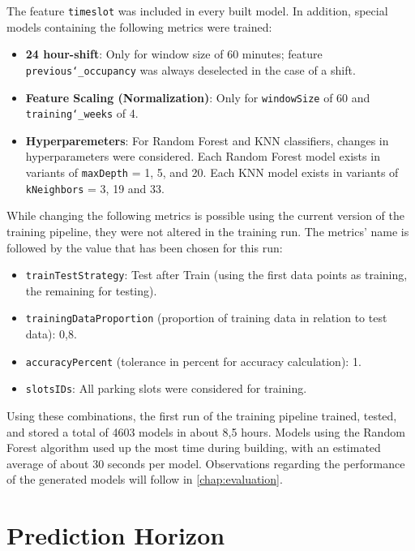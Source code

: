  The feature \texttt{timeslot} was included in every built model. In addition, special models containing the following metrics were trained:
 
 \begin{itemize}
 	\item \textbf{24 hour-shift}: Only for window size of 60 minutes; feature \texttt{previous\char`_occupancy} was always deselected in the case of a shift. 
\item \textbf{Feature Scaling (Normalization)}: Only for \texttt{windowSize} of 60 and \texttt{training\char`_weeks} of 4.
\item \textbf{Hyperparemeters}: For Random Forest and KNN classifiers, changes in hyperparameters were considered. Each Random Forest model exists in variants of \texttt{maxDepth} = 1, 5, and 20. Each KNN model exists in variants of \texttt{kNeighbors} = 3, 19 and 33.
 \end{itemize}
 
 While changing the following metrics is possible using the current version of the training pipeline, they were not altered in the training run. The metrics’ name is followed by the value that has been chosen for this run:
 
 \begin{itemize}
 	\item \texttt{trainTestStrategy}: Test after Train (using the first data points as training, the remaining for testing).
\item \texttt{trainingDataProportion} (proportion of training data in relation to test data): 0,8.
\item \texttt{accuracyPercent} (tolerance in percent for accuracy calculation): 1.
\item \texttt{slotsIDs}: All parking slots were considered for training.
 \end{itemize}
 
 Using these combinations, the first run of the training pipeline trained, tested, and stored a total of 4603 models in about 8,5 hours. Models using the Random Forest algorithm used up the most time during building, with an estimated average of about 30 seconds per model. Observations regarding the performance of the generated models will follow in \autoref{chap:evaluation}.
 
 
 
 \section{Prediction Horizon}

